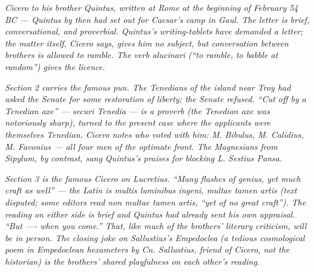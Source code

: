 
\textit{Cicero to his brother Quintus, written at Rome at the
beginning of February 54 BC --- Quintus by then had set out for
Caesar's camp in Gaul. The letter is brief, conversational, and
proverbial. Quintus's writing-tablets have demanded a letter; the
matter itself, Cicero says, gives him no subject, but conversation
between brothers is allowed to ramble. The verb \textit{alucinari}
(``to ramble, to babble at random'') gives the licence.}

\textit{Section 2 carries the famous pun. The Tenedians of the
island near Troy had asked the Senate for some restoration of
liberty; the Senate refused. ``Cut off by a Tenedian axe'' ---
\textit{securi Tenedia} --- is a proverb (the Tenedian axe was
notoriously sharp), turned to the present case where the
applicants were themselves Tenedian. Cicero notes who voted with
him: M. Bibulus, M. Calidius, M. Favonius --- all four men of the
optimate front. The Magnesians from Sipylum, by contrast, sang
Quintus's praises for blocking L. Sestius Pansa.}

\textit{Section 3 is the famous Cicero on Lucretius. ``Many flashes
of genius, yet much craft as well'' --- the Latin is
\textit{multis luminibus ingeni, multae tamen artis} (text
disputed; some editors read \textit{non multae tamen artis},
``yet of no great craft''). The reading on either side is brief
and Quintus had already sent his own appraisal. ``But ---- when
you come.'' That, like much of the brothers' literary criticism,
will be in person. The closing joke on Sallustius's
\textit{Empedoclea} (a tedious cosmological poem in Empedoclean
hexameters by Cn. Sallustius, friend of Cicero, not the historian)
is the brothers' shared playfulness on each other's reading.}
